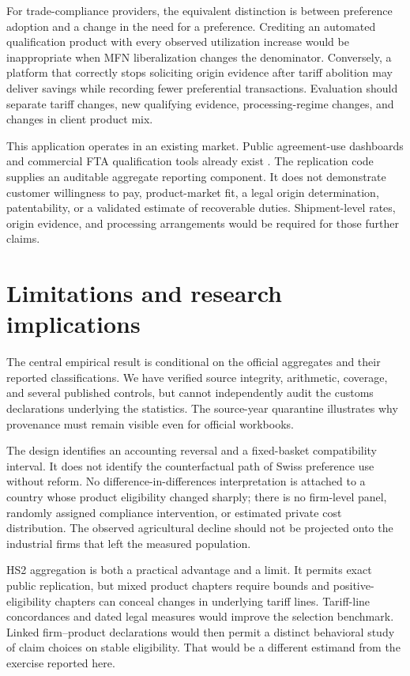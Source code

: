 \documentclass[11pt,a4paper]{article}
\begin{document}
For trade-compliance providers, the equivalent distinction is between preference adoption and a change in the need for a preference. Crediting an automated qualification product with every observed utilization increase would be inappropriate when MFN liberalization changes the denominator. Conversely, a platform that correctly stops soliciting origin evidence after tariff abolition may deliver savings while recording fewer preferential transactions. Evaluation should separate tariff changes, new qualifying evidence, processing-regime changes, and changes in client product mix.

This application operates in an existing market. Public agreement-use dashboards and commercial FTA qualification tools already exist \citep{secomonitor2026,thomson2026,descartes2026}. The replication code supplies an auditable aggregate reporting component. It does not demonstrate customer willingness to pay, product-market fit, a legal origin determination, patentability, or a validated estimate of recoverable duties. Shipment-level rates, origin evidence, and processing arrangements would be required for those further claims.

\section{Limitations and research implications}
The central empirical result is conditional on the official aggregates and their reported classifications. We have verified source integrity, arithmetic, coverage, and several published controls, but cannot independently audit the customs declarations underlying the statistics. The source-year quarantine illustrates why provenance must remain visible even for official workbooks.

The design identifies an accounting reversal and a fixed-basket compatibility interval. It does not identify the counterfactual path of Swiss preference use without reform. No difference-in-differences interpretation is attached to a country whose product eligibility changed sharply; there is no firm-level panel, randomly assigned compliance intervention, or estimated private cost distribution. The observed agricultural decline should not be projected onto the industrial firms that left the measured population.

HS2 aggregation is both a practical advantage and a limit. It permits exact public replication, but mixed product chapters require bounds and positive-eligibility chapters can conceal changes in underlying tariff lines. Tariff-line concordances and dated legal measures would improve the selection benchmark. Linked firm--product declarations would then permit a distinct behavioral study of claim choices on stable eligibility. That would be a different estimand from the exercise reported here.
\end{document}

